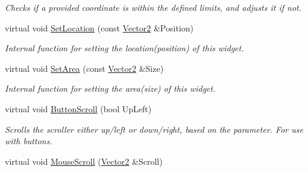 \begin{DoxyCompactItemize}
\begin{DoxyCompactList}\small\item\em Checks if a provided coordinate is within the defined limits, and adjusts it if not. \item\end{DoxyCompactList}\item 
\hypertarget{classphys_1_1UI_1_1Scrollbar_add3d5f729e542fe17eda663fce86d3a3}{
virtual void \hyperlink{classphys_1_1UI_1_1Scrollbar_add3d5f729e542fe17eda663fce86d3a3}{SetLocation} (const \hyperlink{classphys_1_1Vector2}{Vector2} \&Position)}
\label{classphys_1_1UI_1_1Scrollbar_add3d5f729e542fe17eda663fce86d3a3}

\begin{DoxyCompactList}\small\item\em Internal function for setting the location(position) of this widget. \item\end{DoxyCompactList}\item 
\hypertarget{classphys_1_1UI_1_1Scrollbar_a82ee692ee5215893d31dab0dd76374ba}{
virtual void \hyperlink{classphys_1_1UI_1_1Scrollbar_a82ee692ee5215893d31dab0dd76374ba}{SetArea} (const \hyperlink{classphys_1_1Vector2}{Vector2} \&Size)}
\label{classphys_1_1UI_1_1Scrollbar_a82ee692ee5215893d31dab0dd76374ba}

\begin{DoxyCompactList}\small\item\em Internal function for setting the area(size) of this widget. \item\end{DoxyCompactList}\item 
\hypertarget{classphys_1_1UI_1_1Scrollbar_a31a2e11f27f087154fd61d7cc2cd6dc1}{
virtual void \hyperlink{classphys_1_1UI_1_1Scrollbar_a31a2e11f27f087154fd61d7cc2cd6dc1}{ButtonScroll} (bool UpLeft)}
\label{classphys_1_1UI_1_1Scrollbar_a31a2e11f27f087154fd61d7cc2cd6dc1}

\begin{DoxyCompactList}\small\item\em Scrolls the scroller either up/left or down/right, based on the parameter. For use with buttons. \item\end{DoxyCompactList}\item 
\hypertarget{classphys_1_1UI_1_1Scrollbar_ac50a2cd5b85c8b2ff0cabf22b898a0fa}{
virtual void \hyperlink{classphys_1_1UI_1_1Scrollbar_ac50a2cd5b85c8b2ff0cabf22b898a0fa}{MouseScroll} (\hyperlink{classphys_1_1Vector2}{Vector2} \&Scroll)}
\label{classphys_1_1UI_1_1Scrollbar_ac50a2cd5b85c8b2ff0cabf22b898a0fa}


\end{DoxyCompactItemize}
